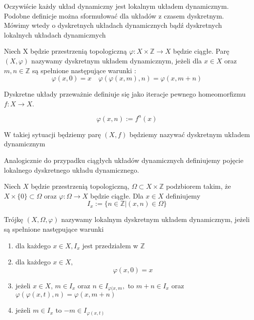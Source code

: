  Oczywiście każdy układ dynamiczny jest lokalnym układem dynamicznym. 
 Podobne definicje można sformułować dla układów z czasem dyskretnym. Mówimy wtedy o dyskretnych układach dynamicznych bądź dyskretnych lokalnych układach dynamicznych
 
 \begin{definition}
 \label{iterowanyUkladDynamiczny}
 
 
  Niech X będzie przestrzenią topologiczną $ \varphi : X \times \mathbb{Z} \to X $ będzie ciągłe. Parę $ (X,\varphi) $ nazywamy dyskretnym układem dynamicznym,
  jeżeli dla $ x \in X $ oraz $ m,n \in \mathbb Z $ są spełnione następujące warunki :
    $$
      \varphi(x,0) = x \quad
      \varphi(\varphi(x,m),n) = \varphi(x,m+n)
    $$
    
 \end{definition}
 
 Dyskretne układy przeważnie definiuje się jako iteracje pewnego homeomorfizmu $ f : X \to X $.
 
  $$
   \varphi(x,n) := f^n(x)
  $$
  
  W takiej sytuacji będziemy parę $(X,f)$ będziemy nazywać dyskretnym układem dynamicznym
  
  Analogicznie do przypadku ciągłych układów dynamicznych definiujemy pojęcie lokalnego dyskretnego 
  układu dynamicznego.
  
  
  \begin{definition}
    Niech $ X $ będzie przestrzenią topologiczną, $\Omega \subset X \times \mathbb Z $ podzbiorem takim, że $ X\times \{0\} \subset \Omega $ 
    oraz $ \varphi : \Omega \to X $ będzie ciągłe. Dla $ x \in X $ definiujemy 
    $$
	I_x := \{n \in \mathbb Z | (x,n) \in \Omega \}
    $$
    
    Trójkę $(X,\Omega,\varphi) $ nazywamy lokalnym dyskretnym układem dynamicznym, jeżeli są spełnione następujące warunki
    
    \begin{enumerate}
     \item dla każdego $ x\in X , I_x $ jest przedziałem w $ \mathbb Z $
     \item dla każdego $x\in X$, 
	    $$ \varphi(x,0) = x $$
     \item jeżeli $x \in X $, $ m \in I_x$ oraz $ n\in I_{\varphi(x,m},$ to $ m+n \in I_x $ oraz $ \varphi(\varphi(x,t),n) = \varphi(x,m+n) $
     \item jeżeli $ m\in I_x $ to $-m \in I_{\varphi(x,t)} $
    \end{enumerate}
    
    
    
  \end{definition}
  
